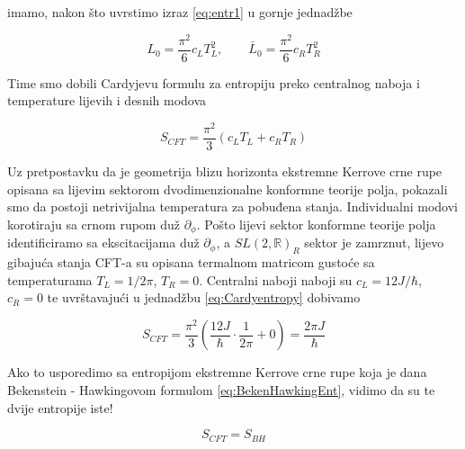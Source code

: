 \noindent imamo, nakon što uvrstimo izraz \eqref{eq:entr1} u gornje jednadžbe 

\begin{equation}
L_0=\frac{\pi^2}{6}c_L T_L^2,\qquad \bar{L}_0=\frac{\pi^2}{6}c_R T_R^2
\end{equation}

\noindent Time smo dobili Cardyjevu formulu za entropiju preko centralnog naboja i temperature lijevih i desnih modova

\begin{equation}
S_{CFT}=\frac{\pi^2}{3}(c_L T_L+c_R T_R)
\label{eq:Cardyentropy}
\end{equation}

Uz pretpostavku da je geometrija blizu horizonta ekstremne Kerrove crne rupe opisana sa lijevim sektorom dvodimenzionalne konformne teorije polja, pokazali smo da postoji netrivijalna temperatura za pobuđena stanja. Individualni modovi korotiraju sa crnom rupom duž $\partial_\phi$. Pošto lijevi sektor konformne teorije polja identificiramo sa ekscitacijama duž $\partial_\phi$, a $SL(2,\mathbb{R})_R$ sektor je zamrznut, lijevo gibajuća stanja CFT-a su opisana termalnom matricom gustoće sa temperaturama $T_L=1/2\pi$, $T_R=0$. Centralni naboji naboji su $c_L=12 J/\hbar$, $c_R=0$ te uvrštavajući u jednadžbu  \eqref{eq:Cardyentropy} dobivamo

\begin{equation}
S_{CFT}=\frac{\pi^2}{3}(\frac{12 J}{\hbar}\cdot\frac{1}{2\pi}+0)=\frac{2\pi J}{\hbar}
\end{equation}

\noindent Ako to usporedimo sa entropijom ekstremne Kerrove crne rupe koja je dana  Bekenstein - Hawkingovom formulom \eqref{eq:BekenHawkingEnt}, vidimo da su te dvije entropije iste!

\begin{equation}
S_{CFT}=S_{BH}
\end{equation}






